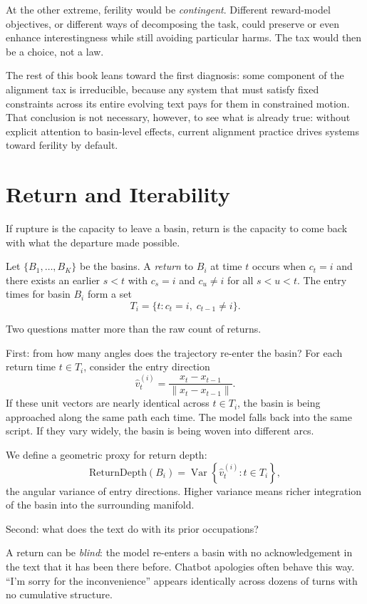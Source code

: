 \documentclass[12pt,a4paper]{article}
\begin{document}
At the other extreme, ferility would be \emph{contingent}. Different reward-model objectives, or different ways of decomposing the task, could preserve or even enhance interestingness while still avoiding particular harms. The tax would then be a choice, not a law.

The rest of this book leans toward the first diagnosis: some component of the alignment tax is irreducible, because any system that must satisfy fixed constraints across its entire evolving text pays for them in constrained motion. That conclusion is not necessary, however, to see what is already true: without explicit attention to basin-level effects, current alignment practice drives systems toward ferility by default.


\section{Return and Iterability}

If rupture is the capacity to leave a basin, return is the capacity to come back with what the departure made possible.

Let $\{B_1, \ldots, B_K\}$ be the basins. A \emph{return} to $B_i$ at time $t$ occurs when $c_t = i$ and there exists an earlier $s < t$ with $c_s = i$ and $c_u \neq i$ for all $s < u < t$. The entry times for basin $B_i$ form a set
\[
T_i = \{ t : c_t = i,\; c_{t-1} \neq i \}.
\]

Two questions matter more than the raw count of returns.

First: from how many angles does the trajectory re-enter the basin? For each return time $t \in T_i$, consider the entry direction
\[
\hat{v}_t^{(i)} = \frac{x_t - x_{t-1}}{\|x_t - x_{t-1}\|}.
\]
If these unit vectors are nearly identical across $t \in T_i$, the basin is being approached along the same path each time. The model falls back into the same script. If they vary widely, the basin is being woven into different arcs.

We define a geometric proxy for return depth:
\begin{equation}
\text{ReturnDepth}(B_i) = \operatorname{Var}\left\{\hat{v}^{(i)}_t : t \in T_i\right\},
\end{equation}
the angular variance of entry directions. Higher variance means richer integration of the basin into the surrounding manifold.

Second: what does the text do with its prior occupations?

A return can be \emph{blind}: the model re-enters a basin with no acknowledgement in the text that it has been there before. Chatbot apologies often behave this way. ``I'm sorry for the inconvenience'' appears identically across dozens of turns with no cumulative structure.
\end{document}
